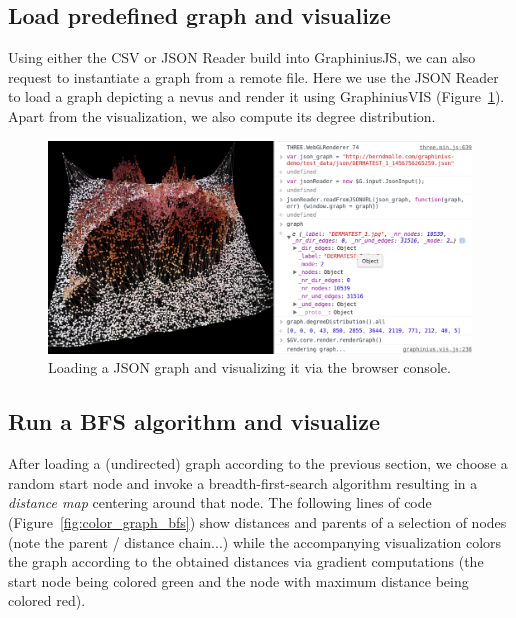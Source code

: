 	
	\subsection{Load predefined graph and visualize}
	\label{ssect:load_graph}
	
	Using either the CSV or JSON Reader build into GraphiniusJS, we can also request to instantiate a graph from a remote file. Here we use the JSON Reader to load a graph depicting a nevus and render it using GraphiniusVIS (Figure~\ref{fig:load_graph_repl}). Apart from the visualization, we also compute its degree distribution.
	
	\begin{figure}[H]
		\begin{center}
			\includegraphics [width=1\textwidth] {figures/loadingGraphInREPL}
			\caption{Loading a JSON graph and visualizing it via the browser console.}
			\label{fig:load_graph_repl}
		\end{center}
	\end{figure}
	
	
	\subsection{Run a BFS algorithm and visualize}
	\label{ssect:run_bfs_visualize}
	
	After loading a (undirected) graph according to the previous section, we choose a random start node and invoke a breadth-first-search algorithm resulting in a \textit{distance map} centering around that node. The following lines of code (Figure~\ref{fig:color_graph_bfs}) show distances and parents of a selection of nodes (note the parent / distance chain...) while the accompanying visualization colors the graph according to the obtained distances via gradient computations (the start node being colored green and the node with maximum distance being colored red).
	
